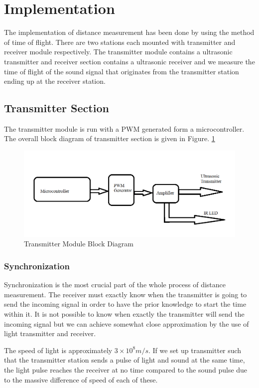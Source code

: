 \section{Implementation}
The implementation of distance measurement has been done by using the method of time of flight. There are two stations each mounted with transmitter and receiver module respectively. The transmitter module contains a ultrasonic transmitter and receiver section contains a ultrasonic receiver and we measure the time of flight of the sound signal that originates from the transmitter station ending up at the receiver station.
\subsection{Transmitter Section}
The transmitter module is run with a PWM generated form a microcontroller. The overall block diagram of transmitter section is given in Figure. \ref{fig:TransmitterBlock}

\begin{figure}[h!]
	\centering
	\includegraphics[width=120mm]{Images/TransmitterBlock.png}
	\caption{Transmitter Module Block Diagram}
	\label{fig:TransmitterBlock}
\end{figure}

\subsubsection{Synchronization}
Synchronization is the most crucial part of the whole process of distance measurement. The receiver must exactly know when the transmitter is going to send the incoming signal in order to have the prior knowledge to start the time within it. It is not possible to know when exactly the transmitter will send the incoming signal but we can achieve somewhat close approximation by the use of light transmitter and receiver. 

The speed of light is approximately $3\times 10^8 m/s$. If we set up transmitter such that the transmitter station sends a pulse of light and sound at the same time, the light pulse reaches the receiver at no time compared to the sound pulse due to the massive difference of speed of each of these.

